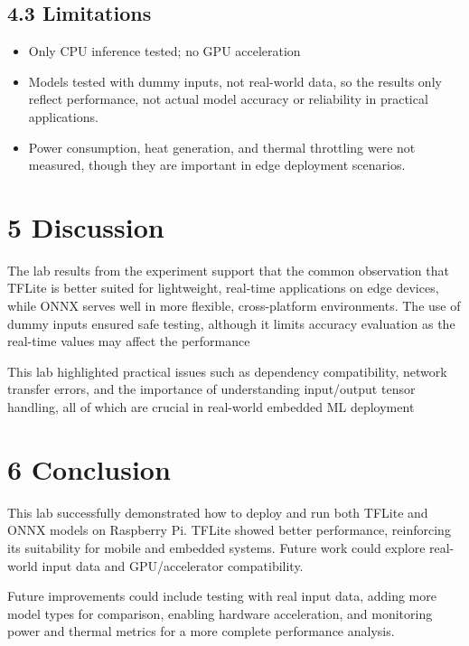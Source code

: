 \documentclass[12pt]{article}
\begin{document}
\subsection*{4.3 Limitations}
\begin{itemize}

\item Only CPU inference tested; no GPU acceleration

\item Models tested with dummy inputs, not real-world data, so the results only reflect performance, not actual model accuracy or reliability in practical applications.

\item Power consumption, heat generation, and thermal throttling were not measured, though they are important in edge deployment scenarios.
\end{itemize}

\section*{5 Discussion}
The lab results from the experiment support that the common observation that TFLite is better suited for lightweight, real-time applications on edge devices, while ONNX serves well in more flexible, cross-platform environments. The use of dummy inputs ensured safe testing, although it limits accuracy evaluation as the real-time values may affect the performance 

This lab highlighted practical issues such as dependency compatibility, network transfer errors, and the importance of understanding input/output tensor handling, all of which are crucial in real-world embedded ML deployment 

\section*{6 Conclusion}
 This lab successfully demonstrated how to deploy and run both TFLite and ONNX models on Raspberry Pi. TFLite showed better performance, reinforcing its suitability for mobile and embedded systems. Future work could explore real-world input data and GPU/accelerator compatibility.

Future improvements could include testing with real input data, adding more model types for comparison, enabling hardware acceleration, and monitoring power and thermal metrics for a more complete performance analysis.
\end{document}
